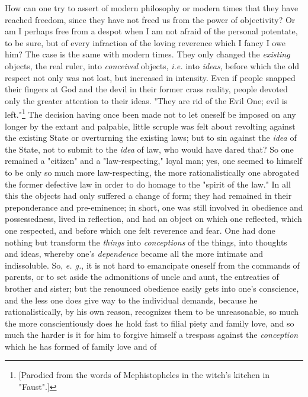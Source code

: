 \documentclass[a4paper]{book}
\begin{document}
How can one try to assert of modern philosophy or modern times that they have 
reached freedom, since they have not freed us from the power of objectivity? 
Or am I perhaps free from a despot when I am not afraid of the personal 
potentate, to be sure, but of every infraction of the loving reverence which I 
fancy I owe him? The case is the same with modern times. They only changed the 
\textit{existing} objects, the real ruler, into \textit{conceived} objects, 
\textit{i.e.} into \textit{ideas}, before which the old respect not only was 
not lost, but increased in intensity. Even if people snapped their fingers at 
God and the devil in their former crass reality, people devoted only the 
greater attention to their ideas. "{}They are rid of the Evil One; evil is 
left."{}\footnote{[Parodied from the words of Mephistopheles in the witch's 
kitchen in "{}Faust"{}.]} The decision having once been made not to let 
oneself be imposed on any longer by the extant and palpable, little scruple 
was felt about revolting against the existing State or overturning the 
existing laws; but to sin against the \textit{idea} of the State, not to 
submit to the \textit{idea} of law, who would have dared that? So one remained 
a "{}citizen"{} and a "{}law-respecting,"{} loyal man; yes, one seemed to 
himself to be only so much more law-respecting, the more rationalistically one 
abrogated the former defective law in order to do homage to the "{}spirit of 
the law."{} In all this the objects had only suffered a change of form; they 
had remained in their preponderance and pre-eminence; in short, one was still 
involved in obedience and possessedness, lived in reflection, and had an 
object on which one reflected, which one respected, and before which one felt 
reverence and fear. One had done nothing but transform the \textit{things} 
into \textit{conceptions} of the things, into thoughts and ideas, whereby 
one's \textit{dependence} became all the more intimate and indissoluble. So, 
\textit{e. g.}, it is not hard to emancipate oneself from the commands of 
parents, or to set aside the admonitions of uncle and aunt, the entreaties of 
brother and sister; but the renounced obedience easily gets into one's 
conscience, and the less one does give way to the individual demands, because 
he rationalistically, by his own reason, recognizes them to be unreasonable, 
so much the more conscientiously does he hold fast to filial piety and family 
love, and so much the harder is it for him to forgive himself a trespass 
against the \textit{conception} which he has formed of family love and of 
\end{document}
